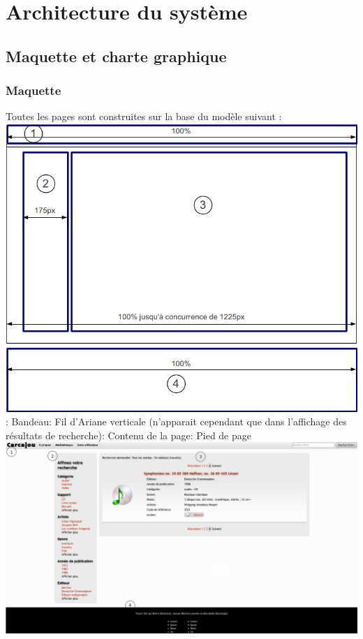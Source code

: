 \documentclass[letter, 10pt]{report}
\begin{document}
\chapter{Architecture du système}

\section{Maquette et charte graphique}

\subsection{Maquette}

Toutes les pages sont construites sur la base du modèle suivant :
\newline
\includegraphics[scale=0.6]{maquetteImage.png}
 : Bandeau: Fil d'Ariane verticale (n'apparait cependant que dans l'affichage des résultats de recherche): Contenu de la page: Pied de page\newline
\includegraphics[scale=0.3]{pageType.png}
\end{document}
